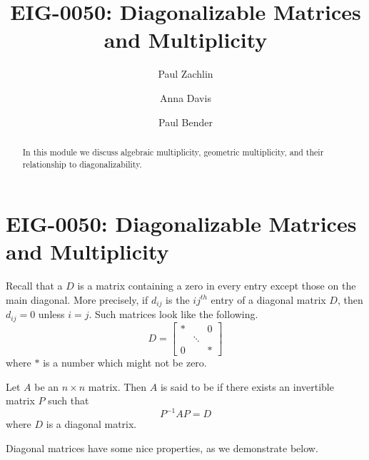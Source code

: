 \documentclass{ximera}
\author{Paul Zachlin \and Anna Davis \and Paul Bender} \title{EIG-0050: Diagonalizable Matrices and Multiplicity} \license{CC-BY 4.0}
\begin{document}
\begin{abstract}
In this module we discuss algebraic multiplicity, geometric multiplicity, and their relationship to diagonalizability.
\end{abstract}
\maketitle

\section*{EIG-0050: Diagonalizable Matrices and Multiplicity}
Recall that a  $D$ is a matrix containing a zero in every entry except those on the main diagonal.  More precisely, if $d_{ij}$ is the $ij^{th}$ entry of a diagonal matrix $D$, then
$d_{ij}=0$ unless $i=j$. Such
matrices look like the following.
\begin{equation*}
D = 
\begin{bmatrix}
* &  & 0 \\
& \ddots &  \\
0 &  & *
\end{bmatrix}
\end{equation*}
where $*$ is a number which might not be zero.


\begin{definition}\label{def:diagonalizable}
Let $A$ be an $n\times n$ matrix. Then $A$ is said to be  if there exists an invertible matrix $P$ such that
\begin{equation*}
P^{-1}AP=D
\end{equation*}
where $D$ is a diagonal matrix.
\end{definition}


Diagonal matrices have some nice properties, as we demonstrate below.
\end{document}
